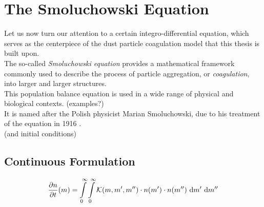 \section{The Smoluchowski Equation}

    Let us now turn our attention to a certain integro-differential equation, which serves as the
    centerpiece of the dust particle coagulation model that this thesis is built upon. \\

    The so-called \textit{Smoluchowski equation} provides a mathematical framework commonly used 
    to describe the process of particle aggregation, or \textit{coagulation}, into larger and 
    larger structures. \\

    This population balance equation is used in a wide range of physical and biological contexts. 
    (examples?) \\

    It is named after the Polish physicist Marian Smoluchowski, due to his treatment of the 
    equation in 1916 \cite{smoluchowski_1916}. \\

    (and initial conditions)

    \subsection{Continuous Formulation}

    
        \begin{equation}
            \label{eq:continuous_smoluchowski_equation}
            \frac{\partial n}{\partial t}(m)
                =
                    \int\limits_0^\infty
                    \int\limits_0^\infty
                    \mathcal K(m,m',m'')
                    \cdot n(m')
                    \cdot n(m'')
                    \ \text{d} m'
                    \ \text{d} m''
        \end{equation}

         \\

